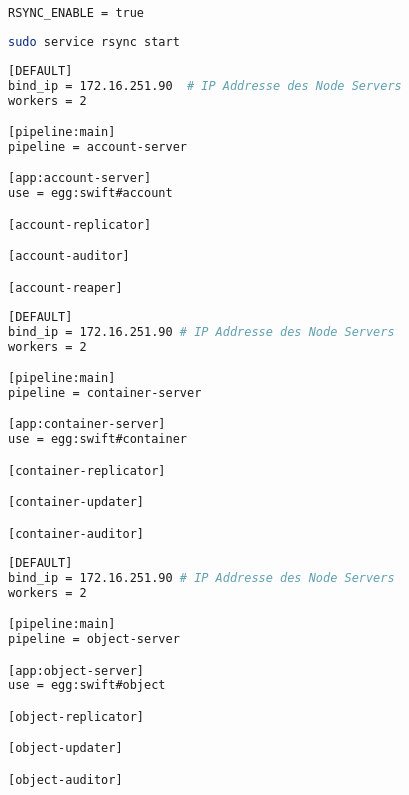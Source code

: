 \begin{lstlisting}[label=configRsyncDefault, language=Bash, caption=Rsync Aktivieren in /etc/default/rsync]
RSYNC_ENABLE = true
\end{lstlisting}

\begin{lstlisting}[label=startRsynx, language=Bash, caption=Rsync Starten]
sudo service rsync start
\end{lstlisting}

\begin{lstlisting}[label=account-server.conf, language=Bash, caption=Account Server in /etc/swift/account-server.conf konfigurieren]
[DEFAULT]
bind_ip = 172.16.251.90  # IP Addresse des Node Servers
workers = 2

[pipeline:main]
pipeline = account-server

[app:account-server]
use = egg:swift#account

[account-replicator]

[account-auditor]

[account-reaper]
\end{lstlisting}


\begin{lstlisting}[label=container-server.conf, language=Bash, caption=Container Server in /etc/swift/container-server.conf konfigurieren]
[DEFAULT]
bind_ip = 172.16.251.90 # IP Addresse des Node Servers
workers = 2

[pipeline:main]
pipeline = container-server

[app:container-server]
use = egg:swift#container

[container-replicator]

[container-updater]

[container-auditor]
\end{lstlisting}


\begin{lstlisting}[label=object-server.conf, language=Bash, caption=Object Server in /etc/swift/object-server.conf konfigurieren]
[DEFAULT]
bind_ip = 172.16.251.90 # IP Addresse des Node Servers
workers = 2

[pipeline:main]
pipeline = object-server

[app:object-server]
use = egg:swift#object

[object-replicator]

[object-updater]

[object-auditor]
\end{lstlisting}


